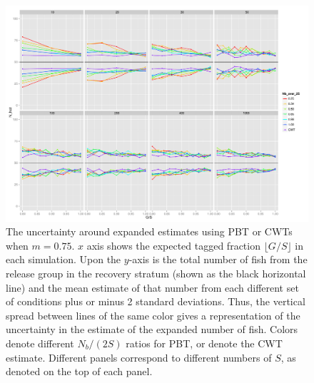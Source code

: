 \documentclass[11pt]{article}
\begin{document}
\begin{figure}
\includegraphics[width = .93\textwidth]{./images/sd_line_horns_m_0_75.pdf}
\caption{The uncertainty around expanded estimates using PBT or CWTs when $m = 0.75$.  $x$ axis shows the
expected tagged fraction $\lfloor G/S \rfloor$ in each simulation. Upon the $y$-axis is the total number of fish from the
release group in the recovery stratum (shown as the black horizontal line) and the mean estimate of that number from each different set of 
conditions plus or minus 2 standard deviations.  Thus, the vertical spread between lines of the same color gives a representation
of the uncertainty in the estimate of the expanded number of fish. Colors denote different $N_b/(2S)$ ratios for PBT, or denote
the CWT estimate.  Different
panels correspond to different numbers of $S$, as denoted on the top of each panel.
\label{fig:horn0.75}}
\end{figure}
\end{document}
